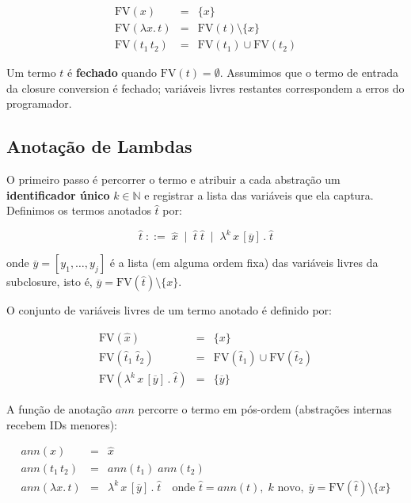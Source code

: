 \[
  \begin{array}{rcl}
    \mathrm{FV}(x)        & = & \{x\} \\
    \mathrm{FV}(\lambda x.\, t) & = & \mathrm{FV}(t) \setminus \{x\} \\
    \mathrm{FV}(t_1\, t_2) & = & \mathrm{FV}(t_1) \cup \mathrm{FV}(t_2)
  \end{array}
\]

Um termo \(t\) é \textbf{fechado} quando \(\mathrm{FV}(t) = \emptyset\).
Assumimos que o termo de entrada da closure conversion é fechado;
variáveis livres restantes correspondem a erros do programador.

\subsection{Anotação de Lambdas}

O primeiro passo é percorrer o termo e atribuir a cada abstração um
\textbf{identificador único} \(k \in \mathbb{N}\) e registrar a lista
das variáveis que ela captura. Definimos os termos anotados
\(\hat{t}\) por:

\[
  \hat{t} \;::=\; \hat{x}
  \;\mid\; \hat{t}\; \hat{t}
  \;\mid\; \lambda^k\, x\,[\overline{y}]\,.\;\hat{t}
\]

onde \(\overline{y} = [y_1, \ldots, y_j]\) é a lista (em alguma ordem
fixa) das variáveis livres da subclosure, isto é,
\(\overline{y} = \mathrm{FV}(\hat{t}) \setminus \{x\}\).

O conjunto de variáveis livres de um termo anotado é definido por:

\[
  \begin{array}{rcl}
    \mathrm{FV}(\hat{x}) & = & \{x\} \\
    \mathrm{FV}(\hat{t}_1\; \hat{t}_2) & = & \mathrm{FV}(\hat{t}_1)
    \cup \mathrm{FV}(\hat{t}_2) \\
    \mathrm{FV}(\lambda^k\, x\,[\overline{y}]\,.\;\hat{t}) & = &
    \{\overline{y}\}
  \end{array}
\]

A função de anotação \(\mathit{ann}\) percorre o termo em
pós-ordem (abstrações internas recebem IDs menores):

\[
  \begin{array}{rcl}
    \mathit{ann}(x) & = & \hat{x} \\[4pt]
    \mathit{ann}(t_1\, t_2) & = & \mathit{ann}(t_1)\;\mathit{ann}(t_2) \\[4pt]
    \mathit{ann}(\lambda x.\, t) & = &
    \lambda^k\, x\,[\overline{y}]\,.\;\hat{t}
    \quad \text{onde } \hat{t} = \mathit{ann}(t),\;
    k \text{ novo},\;
    \overline{y} = \mathrm{FV}(\hat{t}) \setminus \{x\}
  \end{array}
\]


